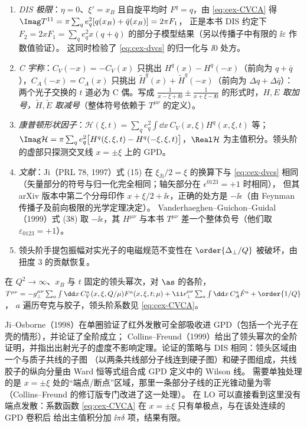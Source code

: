 \begin{remark}[检验、对称性与约定]\label{rem:cex-dvcs}
\begin{enumerate}[label=(\roman*)]
\item \emph{DIS 极限}：$\eta=0$、$\xi'=x_B$ 且自旋平均时 $F^q=q$，由 \cref{eq:cex-CVCA} 得 $\Imag T^{11}=\pi\sum_qe_q^2[q(x_B)+\bar q(x_B)]=2\pi F_1$，
正是本书 DIS 约定下 $F_2=2xF_1=\sum_qe_q^2x(q+\bar q)$ 的部分子模型结果（另以传播子中有限的 $\ii\varepsilon$ 作数值验证）。
这同时检验了 \cref{eq:cex-dvcs} 的归一化与 $\ii0$ 处方。
\item \emph{C 宇称}：$C_V(-x)=-C_V(x)$ 只挑出 $H^q(x)-H^q(-x)$（前向为 $q+\bar q$），$C_A(-x)=C_A(x)$ 只挑出 $\tilde H^q(x)+\tilde H^q(-x)$（前向为 $\Delta q+\Delta\bar q$）：
两个光子交换的 $t$ 道必为 C 偶。写成 $\frac{1}{x-\xi+\ii0}\pm\frac{1}{x+\xi-\ii0}$ 的形式时，\emph{$H,E$ 取加号，$\tilde H,\tilde E$ 取减号}（整体符号依赖于 $T^{\mu\nu}$ 的定义）。
\item \emph{康普顿形状因子}：$\mathcal H(\xi,t)=\sum_qe_q^2\int\dd x\,C_V(x,\xi)H^q(x,\xi,t)$ 等；
$\Imag\mathcal H=\pi\sum_qe_q^2\big[H^q(\xi,\xi,t)-H^q(-\xi,\xi,t)\big]$，$\Real\mathcal H$ 为主值积分。领头阶的虚部只探测交叉线 $x=\pm\xi$ 上的 GPD。
\item \emph{文献}：Ji（PRL 78, 1997）式 (15) 在 $\xi_{\mathrm{Ji}}/2=\xi$ 的换算下与 \cref{eq:cex-dvcs} 相同（矢量部分的符号与归一化完全相同；轴矢部分在 $\epsilon^{0123}=+1$ 时相同），
但其 arXiv 版本中第二个分母印作 $x+\xi/2+\ii\epsilon$，正确的处方是 $-\ii\epsilon$（由 Feynman 传播子及前向极限的光学定理决定）。
Vanderhaeghen--Guichon--Guidal（1999）式 (38) 取 $-\ii\epsilon$，其 $H^{\mu\nu}$ 与本书 $T^{\mu\nu}$ 差一个整体负号（他们取 $\varepsilon_{0123}=+1$）。
\item 领头阶手提包振幅对实光子的电磁规范不变性在 $\order{\Delta_\perp/Q}$ 被破坏，由扭度 3 的贡献恢复。
\end{enumerate}
\end{remark}

\begin{theorem}\tagA\label{thm:cex-dvcs}
在 $Q^2\to\infty$、$x_B$ 与 $t$ 固定的领头幂次，对 $\as$ 的各阶，
$T^{\mu\nu}=-g_\perp^{\mu\nu}\sum_a\int\dd x\,C_V^a(x,\xi,Q/\mu)F^a(x,\xi,t;\mu)+\ii\epsilon_\perp^{\mu\nu}\sum_a\int\dd x\,C^a_A\tilde F^a+\order{1/Q}$，
$a$ 遍历夸克与胶子，领头阶系数见 \cref{eq:cex-CVCA}。
\end{theorem}

\begin{proofsketch}
Ji--Osborne（1998）在单圈验证了红外发散可全部吸收进 GPD（包括一个光子在壳的情形），并论证了全阶成立；
Collins--Freund（1999）给出了领头幂次的全阶证明，并指出出射光子的虚度不影响定理。论证的策略与 DIS 相同：领头区域由一个与质子共线的子图
（以两条共线部分子线连到硬子图）和硬子图组成，共线胶子的纵向分量由 Ward 恒等式组合成 GPD 定义中的 Wilson 线。
需要单独处理的是 $x=\pm\xi$ 处的“端点/断点”区域，那里一条部分子线的正光锥动量为零（Collins--Freund 的修订版专门改进了这一处理）。
在 LO 可以直接看到这里没有端点发散：系数函数 \cref{eq:cex-CVCA} 在 $x=\pm\xi$ 只有单极点，与在该处连续的 GPD 卷积后
给出主值积分加 $\ii\pi\delta$ 项，结果有限。
\end{proofsketch}

